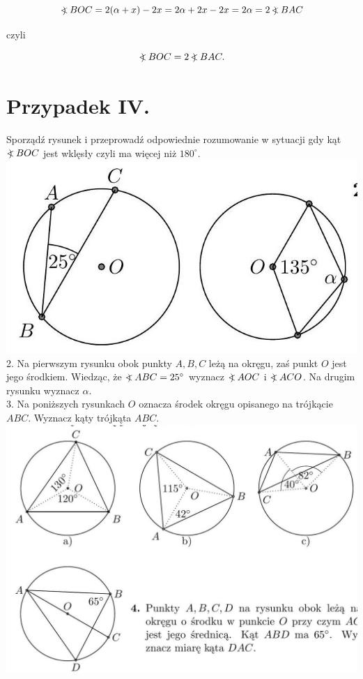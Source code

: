 \documentclass[10pt]{article}
\newcommand\Varangle{\mathop{{<\!\!\!\!\!\text{\small)}}\:}\nolimits}
\begin{document}
\[
\Varangle B O C=2(\alpha+x)-2 x=2 \alpha+2 x-2 x=2 \alpha=2 \Varangle B A C
\]

czyli

\[
\Varangle B O C=2 \Varangle B A C .
\]

\section*{Przypadek IV.}
Sporządź rysunek i przeprowadź odpowiednie rozumowanie w sytuacji gdy kąt \(\Varangle B O C\) jest wklęsły czyli ma więcej niż \(180^{\circ}\).\\
\includegraphics[max width=\textwidth, center]{2024_11_21_71f62bd117d375398909g-182}\\
2. Na pierwszym rysunku obok punkty \(A, B, C\) leżą na okręgu, zaś punkt \(O\) jest jego środkiem. Wiedząc, że \(\Varangle A B C=25^{\circ}\) wyznacz \(\Varangle A O C\) i \(\Varangle A C O\). Na drugim rysunku wyznacz \(\alpha\).\\
3. Na poniższych rysunkach \(O\) oznacza środek okręgu opisanego na trójkącie \(A B C\). Wyznacz kąty trójkąta \(A B C\).\\
\includegraphics[max width=\textwidth, center]{2024_11_21_71f62bd117d375398909g-182(2)}\\
\end{document}
